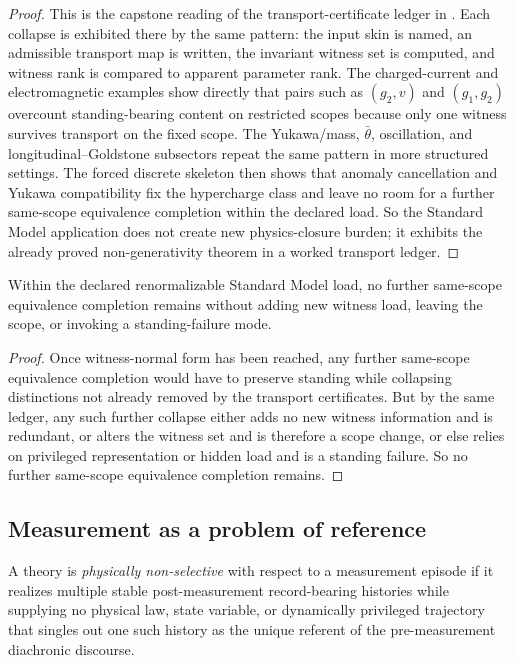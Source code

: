 \begin{proof}
This is the capstone reading of the transport-certificate ledger in \structuradoc{}. Each collapse is exhibited there by the same pattern: the input skin is named, an admissible transport map is written, the invariant witness set is computed, and witness rank is compared to apparent parameter rank. The charged-current and electromagnetic examples show directly that pairs such as $(g_2,v)$ and $(g_1,g_2)$ overcount standing-bearing content on restricted scopes because only one witness survives transport on the fixed scope. The Yukawa/mass, $\bar\theta$, oscillation, and longitudinal--Goldstone subsectors repeat the same pattern in more structured settings. The forced discrete skeleton then shows that anomaly cancellation and Yukawa compatibility fix the hypercharge class and leave no room for a further same-scope equivalence completion within the declared load. So the Standard Model application does not create new physics-closure burden; it exhibits the already proved non-generativity theorem in a worked transport ledger.
\end{proof}

\begin{corollary}
Within the declared renormalizable Standard Model load, no further same-scope equivalence completion remains without adding new witness load, leaving the scope, or invoking a standing-failure mode.
\end{corollary}

\begin{proof}
Once witness-normal form has been reached, any further same-scope equivalence completion would have to preserve standing while collapsing distinctions not already removed by the transport certificates. But by the same ledger, any such further collapse either adds no new witness information and is redundant, or alters the witness set and is therefore a scope change, or else relies on privileged representation or hidden load and is a standing failure. So no further same-scope equivalence completion remains.
\end{proof}

\subsection{Measurement as a problem of reference}

\begin{definition}
A theory is \emph{physically non-selective} with respect to a measurement episode if it realizes multiple stable post-measurement record-bearing histories while supplying no physical law, state variable, or dynamically privileged trajectory that singles out one such history as the unique referent of the pre-measurement diachronic discourse.
\end{definition}

